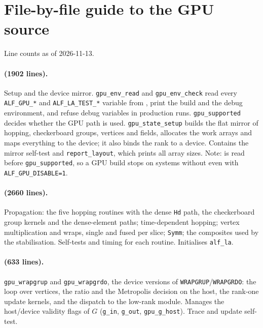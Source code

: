 \section{File-by-file guide to the GPU source}
\label{app:files}

Line counts as of 2026-11-13.

\paragraph{ (1902 lines).} Setup and the device mirror. \texttt{gpu\_env\_read} and \texttt{gpu\_env\_check} read every \texttt{ALF\_GPU\_*} and \texttt{ALF\_LA\_TEST\_*} variable from , print the build and the debug environment, and refuse debug variables in production runs. \texttt{gpu\_supported} decides whether the GPU path is used. \texttt{gpu\_state\_setup} builds the flat mirror of hopping, checkerboard groups, vertices and fields, allocates the work arrays and maps everything to the device; it also binds the rank to a device. Contains the mirror self-test and \texttt{report\_layout}, which prints all array sizes. Note:  is read before \texttt{gpu\_supported}, so a GPU build stops on systems without  even with \texttt{ALF\_GPU\_DISABLE=1}.

\paragraph{ (2660 lines).} Propagation: the five hopping routines with the dense \texttt{Hd} path, the checkerboard group kernels and the dense-element paths; time-dependent hopping; vertex multiplication and wraps, single and fused per slice; \texttt{Symm}; the composites used by the stabilisation. Self-tests and timing for each routine. Initialises \texttt{alf\_la}.

\paragraph{ (633 lines).} \texttt{gpu\_wrapgrup} and \texttt{gpu\_wrapgrdo}, the device versions of \texttt{WRAPGRUP}/\texttt{WRAPGRDO}: the loop over vertices, the ratio and the Metropolis decision on the host, the rank-one update kernels, and the dispatch to the low-rank module. Manages the host/device validity flags of $G$ (\texttt{g\_in}, \texttt{g\_out}, \texttt{gpu\_g\_host}). Trace and update self-test.

